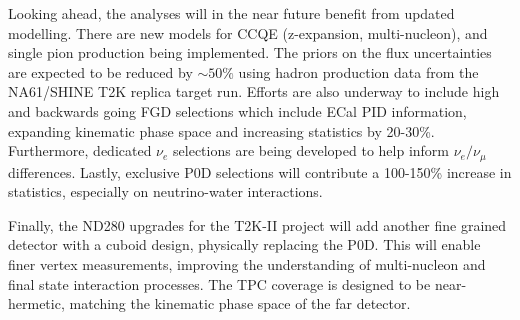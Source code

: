 Looking ahead, the analyses will in the near future benefit from updated modelling. There are new models for CCQE (z-expansion\cite{z-exp}, multi-nucleon\cite{nieves1}), and single pion production\cite{thesis_minoo} being implemented. The priors on the flux uncertainties are expected to be reduced by $\sim50\%$\cite{flux_red} using hadron production data from the NA61/SHINE T2K replica target run. Efforts are also underway to include high and backwards going FGD selections which include ECal PID information, expanding kinematic phase space and increasing statistics by 20-30\%. Furthermore, dedicated $\nu_e$ selections are being developed to help inform $\nu_e/\nu_\mu$ differences. Lastly, exclusive P0D selections will contribute a 100-150\% increase in statistics, especially on neutrino-water interactions.

Finally, the ND280 upgrades\cite{t2k_upgrades} for the T2K-II project\cite{t2k_ii} will add another fine grained detector with a cuboid design, physically replacing the P0D. This will enable finer vertex measurements, improving the understanding of multi-nucleon and final state interaction processes. The TPC coverage is designed to be near-hermetic, matching the kinematic phase space of the far detector.